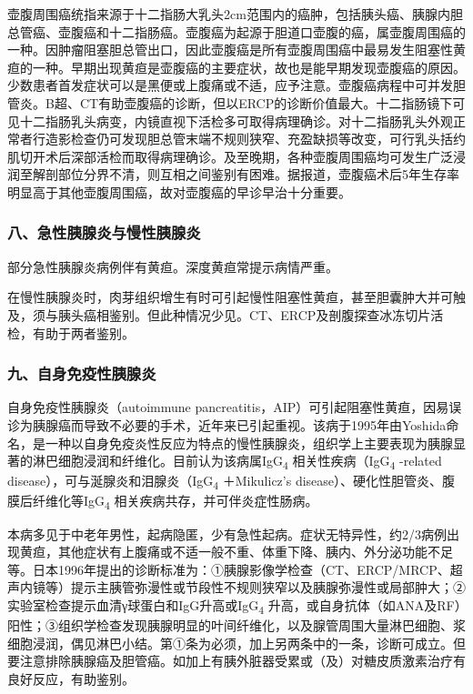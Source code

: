 壶腹周围癌统指来源于十二指肠大乳头2cm范围内的癌肿，包括胰头癌、胰腺内胆总管癌、壶腹癌和十二指肠癌。壶腹癌为起源于胆道口壶腹的癌，属壶腹周围癌的一种。因肿瘤阻塞胆总管出口，因此壶腹癌是所有壶腹周围癌中最易发生阻塞性黄疸的一种。早期出现黄疸是壶腹癌的主要症状，故也是能早期发现壶腹癌的原因。少数患者首发症状可以是黑便或上腹痛或不适，应予注意。壶腹癌病程中可并发胆管炎。B超、CT有助壶腹癌的诊断，但以ERCP的诊断价值最大。十二指肠镜下可见十二指肠乳头病变，内镜直视下活检多可取得病理确诊。对十二指肠乳头外观正常者行造影检查仍可发现胆总管末端不规则狭窄、充盈缺损等改变，可行乳头括约肌切开术后深部活检而取得病理确诊。及至晚期，各种壶腹周围癌均可发生广泛浸润至解剖部位分界不清，则互相之间鉴别有困难。据报道，壶腹癌术后5年生存率明显高于其他壶腹周围癌，故对壶腹癌的早诊早治十分重要。

\subsubsection{八、急性胰腺炎与慢性胰腺炎}

部分急性胰腺炎病例伴有黄疸。深度黄疸常提示病情严重。

在慢性胰腺炎时，肉芽组织增生有时可引起慢性阻塞性黄疸，甚至胆囊肿大并可触及，须与胰头癌相鉴别。但此种情况少见。CT、ERCP及剖腹探查冰冻切片活检，有助于两者鉴别。

\subsubsection{九、自身免疫性胰腺炎}

自身免疫性胰腺炎（autoimmune
pancreatitis，AIP）可引起阻塞性黄疸，因易误诊为胰腺癌而导致不必要的手术，近年来已引起重视。该病于1995年由Yoshida命名，是一种以自身免疫炎性反应为特点的慢性胰腺炎，组织学上主要表现为胰腺显著的淋巴细胞浸润和纤维化。目前认为该病属IgG\textsubscript{4}
相关性疾病（IgG\textsubscript{4} -related
disease），可与涎腺炎和泪腺炎（IgG\textsubscript{4} ＋Mikulicz's
disease）、硬化性胆管炎、腹膜后纤维化等IgG\textsubscript{4}
相关疾病共存，并可伴炎症性肠病。

本病多见于中老年男性，起病隐匿，少有急性起病。症状无特异性，约2/3病例出现黄疸，其他症状有上腹痛或不适一般不重、体重下降、胰内、外分泌功能不足等。日本1996年提出的诊断标准为：①胰腺影像学检查（CT、ERCP/MRCP、超声内镜等）提示主胰管弥漫性或节段性不规则狭窄以及胰腺弥漫性或局部肿大；②实验室检查提示血清γ球蛋白和IgG升高或IgG\textsubscript{4}
升高，或自身抗体（如ANA及RF）阳性；③组织学检查发现胰腺明显的叶间纤维化，以及腺管周围大量淋巴细胞、浆细胞浸润，偶见淋巴小结。第①条为必须，加上另两条中的一条，诊断可成立。但要注意排除胰腺癌及胆管癌。如加上有胰外脏器受累或（及）对糖皮质激素治疗有良好反应，有助鉴别。

